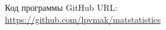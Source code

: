 \documentclass[../main.tex]{subfiles}
\begin{document}
    \noindent Код программы GitHub URL:\\
    \newline \url{https://github.com/lpvmak/matstatistics}
\end{document}
